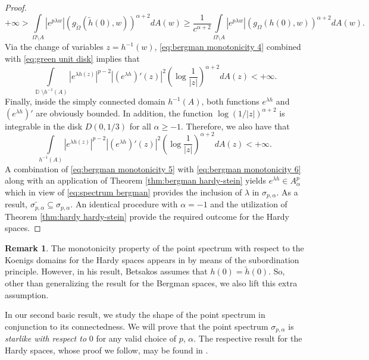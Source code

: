 \documentclass[11pt]{amsart}
\numberwithin{equation}{section}
\theoremstyle{definition}
\newtheorem{remark}[theorem]{Remark}
\DeclareMathOperator{\D}{\mathbb{D}}
\begin{document}
\begin{proof}
		\begin{equation}\label{eq:bergman monotonicity 4}
			+\infty>\int\limits_{\Omega\setminus A}\left|e^{p\lambda w}\right|(g_{\widetilde{\Omega}}(\widetilde{h}(0),w))^{\alpha+2}dA(w)\ge \frac{1}{c^{\alpha+2}} \int\limits_{\Omega\setminus A}\left|e^{p\lambda w}\right|(g_{\Omega}(h(0),w))^{\alpha+2}dA(w).
		\end{equation}
		Via the change of variables $z=h^{-1}(w)$, \eqref{eq:bergman monotonicity 4} combined with \eqref{eq:green unit disk} implies that
		\begin{equation}\label{eq:bergman monotonicity 5}
			\int\limits_{\D\setminus h^{-1}(A)}\left|e^{\lambda h(z)}\right|^{p-2}\left|\left(e^{\lambda h}\right)'(z)\right|^{2}\left(\log\frac{1}{|z|}\right)^{\alpha+2}dA(z)<+\infty.
		\end{equation}
		Finally, inside the simply connected domain $h^{-1}(A)$, both functions $e^{\lambda h}$ and $(e^{\lambda h})'$ are obviously bounded. In addition, the function $\log(1/|z|)^{\alpha+2}$ is integrable in the disk $D(0,1/3)$ for all $\alpha\ge-1$. Therefore, we also have that
		\begin{equation}\label{eq:bergman monotonicity 6}
			\int\limits_{h^{-1}(A)}\left|e^{\lambda h(z)}\right|^{p-2}\left|\left(e^{\lambda h}\right)'(z)\right|^{2}\left(\log\frac{1}{|z|}\right)^{\alpha+2}dA(z)<+\infty.
		\end{equation}
		A combination of \eqref{eq:bergman monotonicity 5} with \eqref{eq:bergman monotonicity 6} along with an application of Theorem \ref{thm:bergman hardy-stein} yields $e^{\lambda h}\in A_\alpha^p$ which in view of \eqref{eq:spectrum bergman} provides the inclusion of $\lambda$ in $\sigma_{p,\alpha}$. As a result, $\widetilde{\sigma_{p,\alpha}}\subseteq\sigma_{p,\alpha}$. An identical procedure with $\alpha=-1$ and the utilization of Theorem \ref{thm:hardy hardy-stein} provide the required outcome for the Hardy spaces.
	\end{proof}
	
	\begin{remark}
		The monotonicity property of the point spectrum with respect to the Koenigs domains for the Hardy spaces appears in \cite[Proposition 1]{betsakos_eig} by means of the subordination principle. However, in his result, Betsakos assumes that $h(0)=\widetilde{h}(0)$. So, other than generalizing the result for the Bergman spaces, we also lift this extra assumption.
	\end{remark}
	
	In our second basic result, we study the shape of the point spectrum in conjunction to its connectedness. We will prove that the point spectrum $\sigma_{p,\alpha}$ is \textit{starlike with respect to} $0$ for any valid choice of $p$, $\alpha$. The respective result for the Hardy spaces, whose proof we follow, may be found in \cite[Lemma 4.3]{gonzalezdona}.
	
\end{document}
